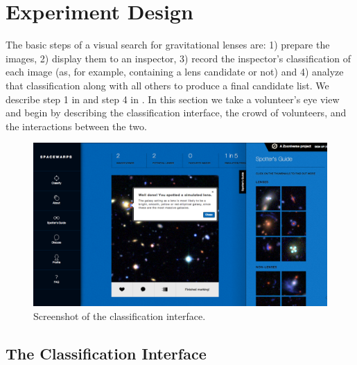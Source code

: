 \documentclass[useAMS,usenatbib,a4paper]{mn2e}
\begin{document}

\section{Experiment Design}
\label{sec:design}

The basic steps of a visual search for gravitational lenses are: 1) prepare
the images, 2) display them to an inspector, 3) record the inspector's
classification of each image (as, for example, containing a lens candidate or
not) and 4) analyze that classification along with all others to produce a
final candidate list. We describe step 1 in  and step 4 in
. In this section we take a volunteer's eye view and begin by
describing the \sw classification interface, the crowd of volunteers, and the
interactions between the two.

\begin{figure}
\centering\includegraphics[width=0.9\linewidth]{sw-system-figs/sw-screengrab-marker+feedback.png}
\caption{Screenshot of the \sw classification interface.}
\label{fig:screenshot}
\end{figure}


\subsection{The Classification Interface}
\label{sec:design:interface}
\end{document}
